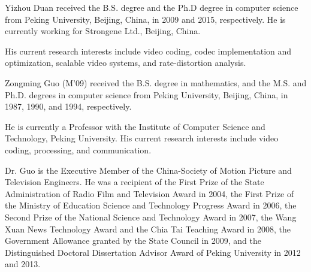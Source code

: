 \documentclass[journal]{IEEEtran}
\begin{document}
\begin{IEEEbiography}{Yizhou Duan}
received the B.S. degree and the Ph.D degree in computer science from Peking University, Beijing, China, in 2009 and 2015, respectively. He is currently working for Strongene Ltd., Beijing, China.

His current research interests include video coding, codec implementation and optimization, scalable video systems, and rate-distortion analysis.
\end{IEEEbiography}

\begin{IEEEbiography}{Zongming Guo}
(M’09) received the B.S. degree in mathematics, and the M.S. and Ph.D. degrees in computer science from Peking University, Beijing, China, in 1987, 1990, and 1994, respectively.

He is currently a Professor with the Institute of Computer Science and Technology, Peking University. His current research interests include video coding, processing, and communication.

Dr. Guo is the Executive Member of the China-Society of Motion Picture and Television Engineers. He was a recipient of the First Prize of the State Administration of Radio Film and Television Award in 2004, the First Prize of the Ministry of Education Science and Technology Progress Award in 2006, the Second Prize of the National Science and Technology Award in 2007, the Wang Xuan News Technology Award and the Chia Tai Teaching Award in 2008, the Government Allowance granted by the State Council in 2009, and the Distinguished Doctoral Dissertation Advisor Award of Peking University in 2012 and 2013.

\end{IEEEbiography}
\end{document}
